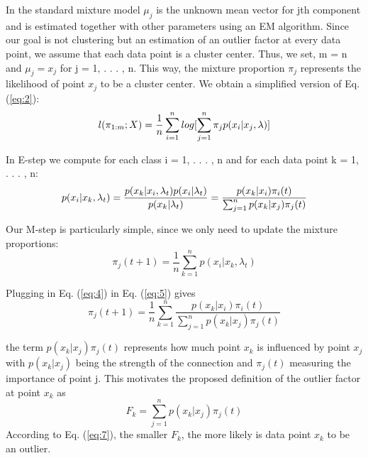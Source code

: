 In the standard mixture model $\mu_j$ is the unknown mean vector for jth component and is estimated together with other parameters using an EM algorithm. Since our goal is not clustering but an estimation of an outlier factor at every data point, we assume that each data point is a cluster center. Thus, we set, m = n and $\mu_j = x_j$ for j = 1, . . . , n. This way, the
mixture proportion $\pi_j$ represents the likelihood of point $x_j$ to be a cluster center. We obtain a simplified version of Eq. (\ref{eq:2}):\\
\begin{equation}\label{eq:3}
  l(\pi_{1:m} ; X)= \frac{1}{n}\sum_{i=1}^{n} {log[\sum_{j=1}^{n}{\pi_ jp(x_i|x_j,\lambda)}]}  \\
 \end{equation}

In E-step we compute for each class i = 1, . . . , n and for each data point k = 1, . . . , n:
\begin{equation}\label{eq:4}
p(x_i|x_k,\lambda_t) = \frac{p(x_k|x_i,\lambda_t)p(x_i|\lambda_t)}{p(x_k|\lambda_t)} \\
= \frac{p(x_k|x_i)\pi_i(t)}{\sum_{j=1}^{n}{p(x_k|x_j)\pi_j(t)}}
\end{equation}

Our M-step is particularly simple, since we only need to update the mixture proportions:
\begin{equation}\label{eq:5}
\pi_j(t+1) = \frac{1}{n}\sum_{k=1}^{n}{p(x_i|x_k,\lambda_t)}
\end{equation}

Plugging in Eq. (\ref{eq:4}) in Eq. (\ref{eq:5}) gives
\begin{equation}\label{eq:6}
\pi_j(t+1) = \frac{1}{n}\sum_{k=1}^{n}{\frac{p(x_k|x_i)\pi_i(t)}{\sum_{j=1}^{n}{p(x_k|x_j)\pi_j(t)}}}
\end{equation}

the term $p(x_k|x_j)\pi_j(t)$ represents how much point $x_k$ is influenced by point $x_j$ with $p(x_k|x_j)$ being the strength of the connection and $\pi_j(t)$ measuring the importance of point j. This motivates the proposed definition of the outlier factor at point $x_k$ as
\begin{equation}\label{eq:7}
F_k = \sum_{j=1}^{n}{p(x_k|x_j)\pi_j(t)}
\end{equation}
According to Eq. (\ref{eq:7}), the smaller $F_k$, the more likely is data point $x_k$ to be an outlier.


